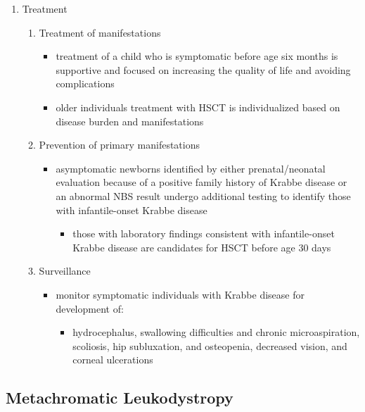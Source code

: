 \documentclass[12pt]{scrartcl}
\begin{document}
\begin{enumerate}
\item Treatment
\label{sec:org498f577}
\begin{enumerate}
\item Treatment of manifestations
\label{sec:orgec19374}
\begin{itemize}
\item treatment of a child who is symptomatic before age six months is
supportive and focused on increasing the quality of life and
avoiding complications
\item older individuals treatment with HSCT is individualized based on
disease burden and manifestations
\end{itemize}

\item Prevention of primary manifestations
\label{sec:orgb1dc08e}
\begin{itemize}
\item asymptomatic newborns identified by either prenatal/neonatal
evaluation because of a positive family history of Krabbe disease
or an abnormal NBS result undergo additional testing to identify
those with infantile-onset Krabbe disease
\begin{itemize}
\item those with laboratory findings consistent with infantile-onset
Krabbe disease are candidates for HSCT before age 30 days
\end{itemize}
\end{itemize}

\item Surveillance
\label{sec:orgf262b60}
\begin{itemize}
\item monitor symptomatic individuals with Krabbe disease for
development of:
\begin{itemize}
\item hydrocephalus, swallowing difficulties and chronic
microaspiration, scoliosis, hip subluxation, and osteopenia,
decreased vision, and corneal ulcerations
\end{itemize}
\end{itemize}
\end{enumerate}
\end{enumerate}
\subsection{Metachromatic Leukodystropy}
\label{sec:org899c502}
\end{document}
